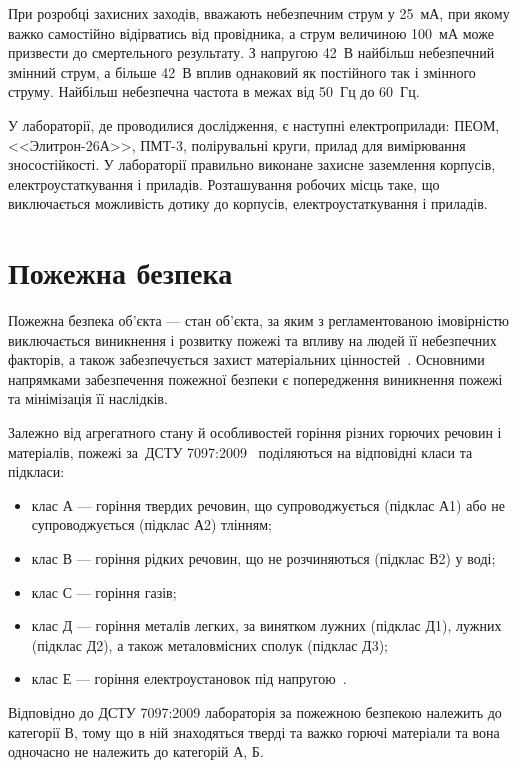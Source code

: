 \documentclass[a4paper,fontsize=14bp,ukrainian]{extreport}
\begin{document}
При розробці захисних заходів, вважають небезпечним струм у 25~мА, при якому важко самостійно відірватись від провідника, а струм величиною 100~мА може призвести до смертельного результату. З напругою 42~В найбільш небезпечний змінний струм, а більше 42~В вплив однаковий як постійного так і змінного струму. Найбільш небезпечна частота в межах від 50~Гц до 60~Гц.~\cite{tkachuk2006}


У лабораторії, де проводилися дослідження, є наступні електроприлади: ПЕОМ, <<Элитрон-26А>>, ПМТ-3, полірувальні круги, прилад для вимірювання зносостійкості. У лабораторії правильно виконане захисне заземлення корпусів, електроустаткування і приладів. Розташування робочих місць таке, що виключається можливість дотику до корпусів, електроустаткування і приладів.

\section{Пожежна безпека}

Пожежна безпека об'єкта --- стан об'єкта, за яким з регламентованою імовірністю виключається виникнення і розвитку пожежі та впливу на людей її небезпечних факторів, а також забезпечується захист матеріальних цінностей~\cite{tkachuk2006}. Основними напрямками забезпечення пожежної безпеки є попередження виникнення пожежі та мінімізація її наслідків.

Залежно від агрегатного стану й особливостей горіння різних горючих речовин і матеріалів, пожежі за~ДСТУ 7097:2009~\cite{dstu:fire_safe2009} поділяються на відповідні класи та підкласи:
\begin{itemize}
\item клас А --- горіння твердих речовин, що супроводжується (підклас А1) або не супроводжується (підклас А2) тлінням;
\item клас В --- горіння рідких речовин, що не розчиняються (підклас В2) у воді;
\item клас С --- горіння газів;
\item клас Д --- горіння металів легких, за винятком лужних (підклас Д1), лужних (підклас Д2), а також металовмісних сполук (підклас Д3);
\item клас Е --- горіння електроустановок під напругою~\cite{pue2009}.
\end{itemize}

Відповідно до ДСТУ 7097:2009 лабораторія за пожежною безпекою належить до категорії В, тому що в ній знаходяться тверді та важко горючі матеріали та вона  одночасно не належить до категорій А, Б.
\end{document}
